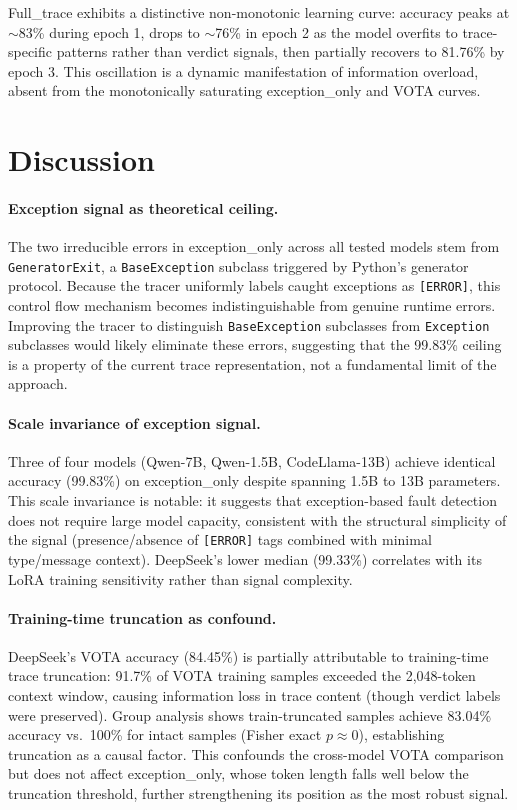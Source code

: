 \documentclass[11pt,a4paper]{article}
\begin{document}
Full\_trace exhibits a distinctive non-monotonic learning curve: accuracy peaks at $\sim$83\% during epoch 1, drops to $\sim$76\% in epoch 2 as the model overfits to trace-specific patterns rather than verdict signals, then partially recovers to 81.76\% by epoch 3. This oscillation is a dynamic manifestation of information overload, absent from the monotonically saturating exception\_only and VOTA curves.

\section{Discussion}
\label{sec:discussion}

\paragraph{Exception signal as theoretical ceiling.}
The two irreducible errors in exception\_only across all tested models stem from \texttt{GeneratorExit}, a \texttt{BaseException} subclass triggered by Python's generator protocol. Because the tracer uniformly labels caught exceptions as \texttt{[ERROR]}, this control flow mechanism becomes indistinguishable from genuine runtime errors. Improving the tracer to distinguish \texttt{BaseException} subclasses from \texttt{Exception} subclasses would likely eliminate these errors, suggesting that the 99.83\% ceiling is a property of the current trace representation, not a fundamental limit of the approach.

\paragraph{Scale invariance of exception signal.}
Three of four models (Qwen-7B, Qwen-1.5B, CodeLlama-13B) achieve identical accuracy (99.83\%) on exception\_only despite spanning 1.5B to 13B parameters. This scale invariance is notable: it suggests that exception-based fault detection does not require large model capacity, consistent with the structural simplicity of the signal (presence/absence of \texttt{[ERROR]} tags combined with minimal type/message context). DeepSeek's lower median (99.33\%) correlates with its LoRA training sensitivity rather than signal complexity.

\paragraph{Training-time truncation as confound.}
DeepSeek's VOTA accuracy (84.45\%) is partially attributable to training-time trace truncation: 91.7\% of VOTA training samples exceeded the 2,048-token context window, causing information loss in trace content (though verdict labels were preserved). Group analysis shows train-truncated samples achieve 83.04\% accuracy vs.\ 100\% for intact samples (Fisher exact $p \approx 0$), establishing truncation as a causal factor. This confounds the cross-model VOTA comparison but does not affect exception\_only, whose token length falls well below the truncation threshold, further strengthening its position as the most robust signal.
\end{document}
